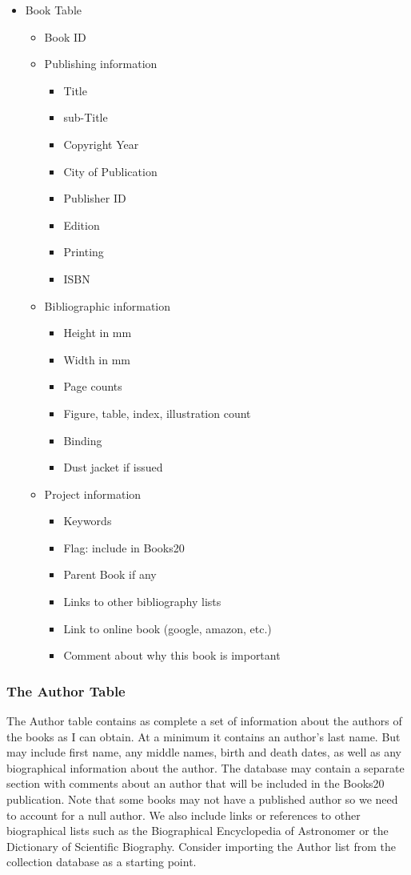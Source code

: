 \documentclass{article}%
\begin{document}
\begin{itemize}
\item Book Table
\begin{itemize}
 \item Book ID
 \item Publishing information
 \begin{itemize}
  \item Title
  \item sub-Title
  \item Copyright Year
  \item City of Publication
  \item Publisher ID
  \item Edition
  \item Printing
  \item ISBN
 \end{itemize}
 \item Bibliographic information
 \begin{itemize}
  \item Height in mm
  \item Width in mm
  \item Page counts
  \item Figure, table, index, illustration count
  \item Binding
  \item Dust jacket if issued
 \end{itemize}
 \item Project information
 \begin{itemize}
  \item Keywords
  \item Flag: include in Books20
  \item Parent Book if any
  \item Links to other bibliography lists
  \item Link to online book (google, amazon, etc.)
  \item Comment about why this book is important
 \end{itemize}
\end{itemize}
\end{itemize}


\subsubsection{The Author Table}

The Author table contains as complete a set of information about the
authors of the books as I can obtain.  At a minimum it contains an
author's last name. But may include first name, any middle names,
birth and death dates, as well as any biographical information about
the author. The database may contain a separate section with comments
about an author that will be included in the Books20 publication. Note
that some books may not have a published author so we need to account
for a null author. We also include links or references to other
biographical lists such as the Biographical Encyclopedia of Astronomer
or the Dictionary of Scientific Biography.  Consider importing the
Author list from the collection database as a starting point.
\end{document}
